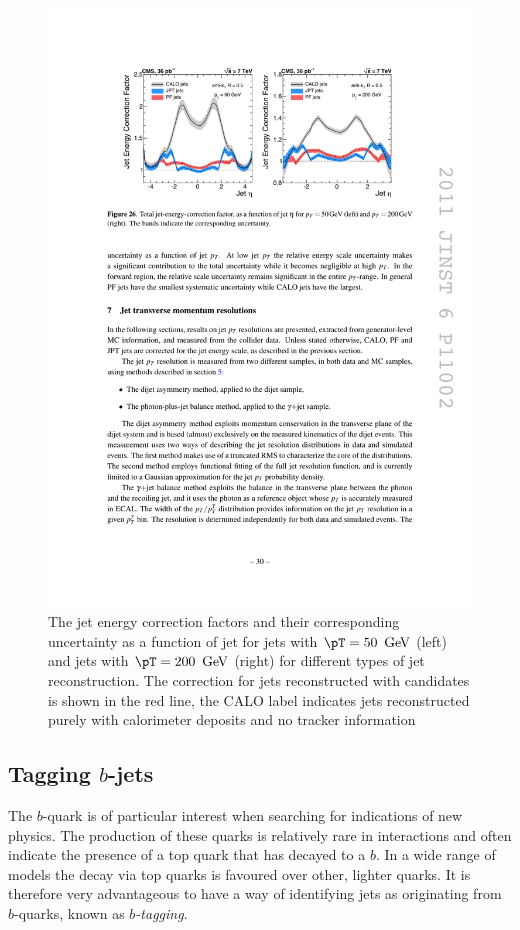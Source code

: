 \begin{figure}
\begin{center}
\includegraphics[width=0.9\linewidth]{figs/reconstruction/jec} \end{center}
\caption{The jet energy correction factors and their corresponding
uncertainty as a function of jet \eta
for jets with $\pT=50~\gev$ (left) and jets with $\pT=200~\gev$
(right) for different types of jet reconstruction. The correction for jets
reconstructed with \PF candidates is shown in the red line, the CALO
label indicates jets reconstructed purely with calorimeter deposits
and no tracker information \cite{1748-0221-6-11-P11002}}
\label{fig:jec} \end{figure}

\subsection{Tagging $b$-jets}
\label{sec:reco_btag}

The $b$-quark is of particular interest when searching for
indications of new physics. The production of these
quarks is relatively rare in \SM interactions and often
indicate the presence of a top quark that has decayed to a
$b$. In a wide range of \SUSY models the decay via top quarks is
favoured over other, lighter quarks. It is therefore very advantageous
to have a way of identifying jets as originating from $b$-quarks,
known as \emph{$b$-tagging}.

